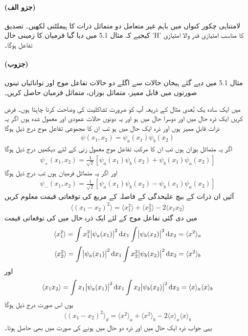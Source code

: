 \paragraph*{(جزو الف)}
لامتناہی چکور کنواں میں باہم غیر متعامل دو متماثل ذرات کا ہیملٹنی لکھیں۔ تصدیق کیجیے کہ مثال 5.1 میں دیا گیا فرمیان کا زمینی حال 'H' کا مناسب امتیازی قدر والا امتیازی تفاعل ہوگا۔ 
\paragraph*{(جزوب)}
مثال 5.1 میں دیے گئے ہیجان حالات سے اگلے دو حالات تفاعل موج اور توانائیاں تینوں صورتوں میں قابل ممیز، متماثل بوزان، متماثل فرمیان حاصل کریں۔


میں ایک سادہ یک بُعدی مثال کے ذریعہ آپ کو ضرورت تشاکلیت کی وضاحت کرنا چاہتا ہوں۔ فرض کریں ایک ذرہ حال  میں اور دوسرا حال  میں ہو اور یہ دونوں حالات عمودی اور معمول شدہ ہوں اگر یہ ذرات قابلِ ممیز ہوں اور ذرہ ایک حال  میں ہو تب ان کا مجموعی تفاعل موج درج ذیل ہوگا
\begin{align}
	\psi(x_1, x_2)=\psi_a(x_1)\psi_b(x_2)
\end{align}
اگر یہ متماثل بوزان ہوں تب ان کا مرکب تفاعل موج  معمول زنی کے لئے دیکھیں درج ذیل ہوگا
\begin{align}
	\psi_+(x_1, x_2) = \frac{1}{\sqrt{2}}[\psi_a(x_1)\psi_b(x_2)+\psi_b(x_1)\psi_a(x_2)]
\end{align}
اور اگر یہ متماثل فرمیان ہوں تب درج ذیل ہوگا
\begin{align}
	\psi_-(x_1, x_2)=\frac{1}{\sqrt{2}}[\psi_a(x_1)\psi_b(x_2)-\psi_b(x_1)\psi_a(x_2)]
\end{align}
آئیں ان ذرات کے بیچ علیحدگی کے فاصلہ کے مربع کی توقعاتی قیمت معلوم کریں
\begin{align}
	\langle(x_1-x_2)^2\rangle=\langle x^2_1\rangle+\langle x_2^2\rangle-2\langle x_1x_2\rangle
\end{align}
  میں دی گئی تفاعل موج کے لئے ایک ذرہ حال  میں  کی توقعاتی قیمت 
\begin{align*}
	\langle x_1^2\rangle=\int x_1^2\abs{\psi_a(x_1)}^2\dif x_1\int\abs{\psi_b(x_2)}^2\dif x_2=\langle x^2\rangle_a
\end{align*}
\begin{align*}
	\langle x_2^2\rangle=\int\abs{\psi_a(x_1)}^2\dif x_1\int x_2^2\abs{\psi_b(x_2)}^2\dif x_2=\langle x^2\rangle_b
\end{align*}
اور
\begin{align*}
	\langle x_1x_2 \rangle=\int x_1\abs{\psi_a(x_1)}^2\dif x_1\int x_2\abs{\psi_b(x_2)}^2\dif x_2=\langle x\rangle_a\langle x \rangle_b
\end{align*}
یوں اس صورت درج ذیل ہوگا
\begin{align}
	\langle(x_1-x_2)^2\rangle_d=\langle x^2\rangle_a+\langle x^2 \rangle_b-2\langle x \rangle_a\langle x \rangle_b
\end{align}
یہی جواب ذرہ ایک حال  میں اور ذرہ دو حال  میں ہونے کی صورت میں بھی حاصل ہوتا۔

